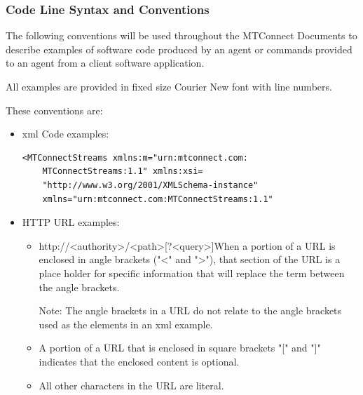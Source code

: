 \documentclass{mtconnect}	%
\begin{document}
\subsubsection{Code Line Syntax and Conventions}

The following conventions will be used throughout the MTConnect Documents to describe examples of software code produced by an \gls{agent} or commands provided to an \gls{agent} from a client software application.

All examples are provided in fixed size Courier New font with line numbers.

These conventions are:

\begin{itemize}

\item \gls{xml} Code examples:

\begin{lstlisting}[firstnumber=last,escapechar=|,%
    caption={XML Code Examples},label={lst:xml-code-examples}]
<MTConnectStreams xmlns:m="urn:mtconnect.com:
    MTConnectStreams:1.1" xmlns:xsi=
    "http://www.w3.org/2001/XMLSchema-instance"
    xmlns="urn:mtconnect.com:MTConnectStreams:1.1"
\end{lstlisting}

\item HTTP URL examples:

\begin{itemize}

\item	http://<authority>/<path>[?<query>]When a portion of a URL is enclosed in angle brackets ("<" and ">"), that section of the URL is a place holder for specific information that will replace the term between the angle brackets. 

\begin{note}
Note:  The angle brackets in a URL do not relate to the angle brackets used as the  elements in an \gls{xml} example.

\end{note}

\item A portion of a URL that is enclosed in square brackets "[" and "]" indicates that the enclosed content is optional. 

\item All other characters in the URL are literal.

\end{itemize}

\end{itemize}
\end{document}
